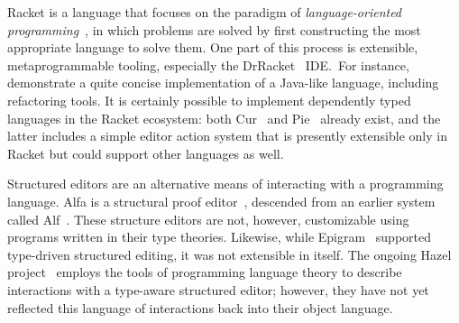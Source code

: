 Racket is a language that focuses on the paradigm of
\emph{language-oriented programming}~\citep{racketManifesto}, in which
problems are solved by first constructing the most appropriate
language to solve them. One part of this process is extensible,
metaprogrammable tooling, especially the DrRacket~\cite{revenge}
IDE.\ For instance, \citet{feltey2016languages} demonstrate a
quite concise implementation of a Java-like language, including refactoring tools.
It is certainly possible to implement dependently typed languages in
the Racket ecosystem: both Cur~\cite{cur} and
Pie~\cite{theLittleTyper} already exist, and the latter includes a
simple editor action system that is presently extensible only in
Racket but could support other languages as well.

Structured editors are an alternative means of interacting with a
programming language.  Alfa is a structural proof editor~\cite{alfa},
descended from an earlier system called Alf~\citep{ALF, ALFthesis}.
These structure editors are not, however, customizable using programs
written in their type theories. Likewise, while
Epigram~\citep{epigram} supported type-driven structured editing, it
was not extensible in itself. The ongoing Hazel
project~\cite{hazelnut,hazelEditor} employs the tools of programming
language theory to describe interactions with a type-aware structured
editor; however, they have not yet reflected this language of
interactions back into their object language.



